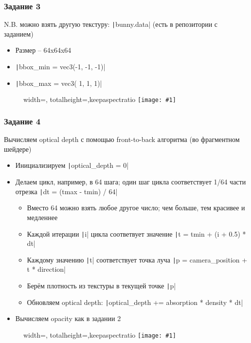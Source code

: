 \documentclass[10pt]{beamer}
\newcommand{\slideimage}[1]{
  \begin{figure}
    \begin{adjustbox}{width=\textwidth, totalheight=\textheight-2\baselineskip-2\baselineskip,keepaspectratio}
      \texttt{[image: \#1]}
    \end{adjustbox}
  \end{figure}
}
\begin{document}
\begin{frame}[fragile]
\frametitle{Задание 3}
N.B. можно взять другую текстуру: \texttt|bunny.data| (есть в репозитории с заданием)
\begin{itemize}
\item Размер -- 64x64x64
\item \texttt|bbox_min = vec3(-1, -1, -1)|
\item \texttt|bbox_max = vec3( 1,  1,  1)|
\end{itemize}
\end{frame}

\begin{frame}[fragile]
\slideimage{3.png}
\end{frame}

\begin{frame}[fragile]
\frametitle{Задание 4}
Вычисляем optical depth с помощью front-to-back алгоритма (во фрагментном шейдере)
\begin{itemize}
\item Инициализируем \texttt|optical_depth = 0|
\item Делаем цикл, например, в 64 шага; один шаг цикла соответствует 1/64 части отрезка \texttt|dt = (tmax - tmin) / 64|
\begin{itemize}
\item Вместо 64 можно взять любое другое число; чем больше, тем красивее и медленнее
\item Каждой итерации \texttt|i| цикла соответвует значение \texttt|t = tmin + (i + 0.5) * dt|
\item Каждому значению \texttt|t| соответствует точка луча \texttt|p = camera_position + t * direction|
\item Берём плотность из текстуры в текущей точке \texttt|p|
\item Обновляем optical depth: \texttt|optical_depth += absorption * density * dt|
\end{itemize}
\item Вычисляем opacity как в задании 2
\end{itemize}
\end{frame}

\begin{frame}[fragile]
\slideimage{4.png}
\end{frame}
\end{document}
